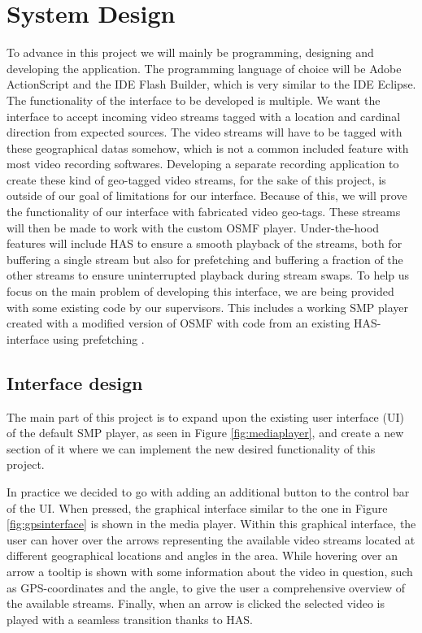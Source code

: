 \chapter{System Design}
\label{cha:sysdesign}

To advance in this project we will mainly be programming, designing and developing the application. The programming language of choice will be Adobe ActionScript and the IDE Flash Builder, which is very similar to the IDE Eclipse. The functionality of the interface to be developed is multiple. We want the interface to accept incoming video streams tagged with a location and cardinal direction from expected sources. The video streams will have to be tagged with these geographical datas somehow, which is not a common included feature with most video recording softwares. Developing a separate recording application to create these kind of geo-tagged video streams, for the sake of this project, is outside of our goal of limitations for our interface. Because of this, we will prove the functionality of our interface with fabricated video geo-tags. These streams will then be made to work with the custom OSMF player.  Under-the-hood features will include HAS to ensure a smooth playback of the streams, both for buffering a single stream but also for prefetching and buffering a fraction of the other streams to ensure uninterrupted playback during stream swaps. To help us focus on the main problem of developing this interface, we are being provided with some existing code by our supervisors. This includes a working SMP player created with a modified version of OSMF with code from an existing HAS-interface using prefetching \cite{qualbranch}.

\section{Interface design}
\label{sec:interfacedesign}

The main part of this project is to expand upon the existing user interface (UI) of the default SMP player, as seen in Figure \ref{fig:mediaplayer}, and create a new section of it where we can implement the new desired functionality of this project. 

In practice we decided to go with adding an additional button to the control bar of the UI. When pressed, the graphical interface similar to the one in Figure \ref{fig:gpsinterface} is shown in the media player. Within this graphical interface, the user can hover over the arrows representing the available video streams located at different geographical locations and angles in the area. While hovering over an arrow a tooltip is shown with some information about the video in question, such as GPS-coordinates and the angle, to give the user a comprehensive overview of the available streams. Finally, when an arrow is clicked the selected video is played with a seamless transition thanks to HAS.

